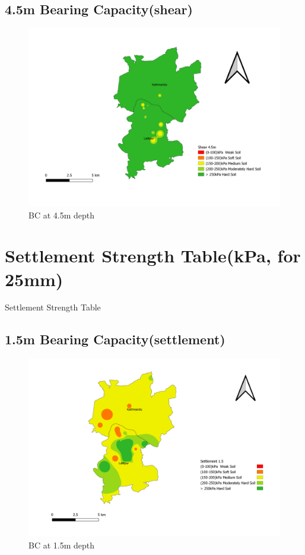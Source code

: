 \begin{landscape}
\section{4.5m Bearing Capacity(shear)}
\begin{figure}[!hbt]
\centering
\includegraphics[width=0.8\linewidth, height=0.8\textheight,keepaspectratio]{in/map/Shear_4_5.png}
\caption{BC at 4.5m depth}
\end{figure}
\pagebreak
\end{landscape}

\section{Settlement Strength Table(kPa, for 25mm)}
\begin{table}[!h]
\caption{Settlement Strength Table}

\end{table}
\pagebreak

\begin{landscape}
\section{1.5m Bearing Capacity(settlement)}
\begin{figure}[!hbt]
\centering
\includegraphics[width=0.8\linewidth, height=0.8\textheight,keepaspectratio]{in/map/Deflection_1_5.png}
\caption{BC at 1.5m depth}
\end{figure}
\pagebreak
\end{landscape}

